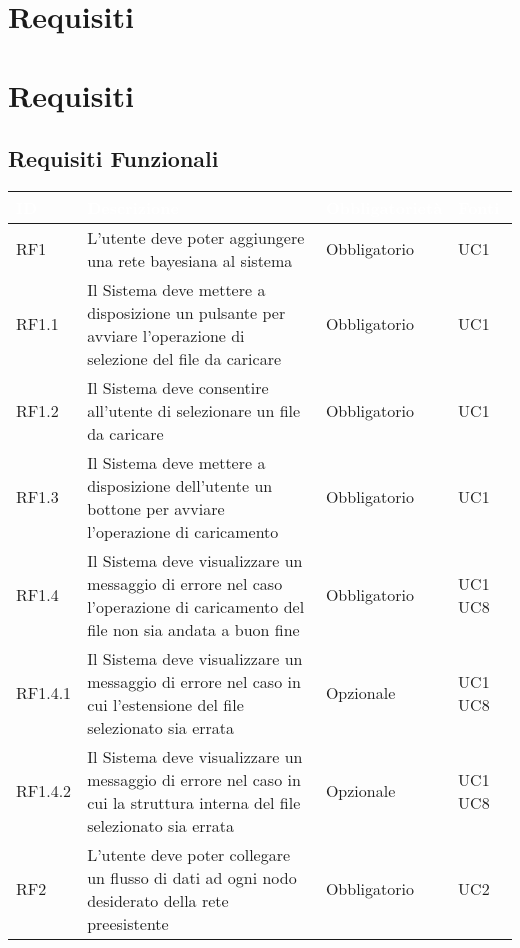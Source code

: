 \section{Requisiti}\label{Requisiti}

\section{Requisiti}\label{Requisiti}

\subsection{Requisiti Funzionali}\label{RF}
\begin{center}
\begin{longtable}[c]{|m{}|m{}|m{}|m{}|}
\hline
\rowcolor{bluelogo}\textbf{\textcolor{white}{ID}} & \textbf{\textcolor{white}{Descrizione}} & \textbf{\textcolor{white}{Obbligatorietà}} & \textbf{\textcolor{white}{Fonti}}\\
\hline \hline
\endhead
RF1 & L'utente deve poter aggiungere una rete bayesiana al sistema & Obbligatorio & UC1\\
\hline
\rowcolor{grigio}RF1.1 & Il Sistema deve mettere a disposizione un pulsante per avviare l'operazione di selezione del file da caricare & Obbligatorio & UC1\\
\hline
RF1.2 & Il Sistema deve consentire all'utente di selezionare un file da caricare & Obbligatorio & UC1\\
\hline
\rowcolor{grigio}RF1.3 & Il Sistema deve mettere a disposizione dell'utente un bottone per avviare l'operazione di caricamento & Obbligatorio & UC1\\
\hline
RF1.4 & Il Sistema deve visualizzare un messaggio di errore nel caso l'operazione di caricamento del file non sia andata a buon fine & Obbligatorio & UC1 UC8\\
\hline
\rowcolor{grigio}RF1.4.1 & Il Sistema deve visualizzare un messaggio di errore nel caso in cui l'estensione del file selezionato sia errata & Opzionale & UC1 UC8\\
\hline
RF1.4.2 & Il Sistema deve visualizzare un messaggio di errore nel caso in cui la struttura interna del file selezionato sia errata & Opzionale & UC1 UC8\\
\hline
\rowcolor{grigio}RF2 & L'utente deve poter collegare un flusso di dati ad ogni nodo desiderato della rete preesistente & Obbligatorio & UC2\\

\end{longtable}
\end{center}
